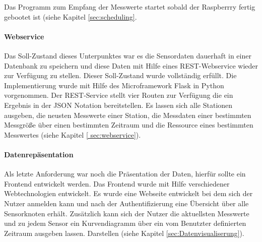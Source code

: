 Das Programm zum Empfang der Messwerte startet sobald der Raspberrry fertig gebootet ist (siehe Kapitel \ref{sec:scheduling}.
\paragraph{Webservice} Das Soll-Zustand dieses Unterpunktes war es die Sensordaten dauerhaft in einer Datenbank zu speichern und diese Daten mit Hilfe eines REST-Webservice wieder zur Verfügung zu stellen. Dieser Soll-Zustand wurde vollständig erfüllt. Die Implementierung wurde mit Hilfe des Microframework Flask in Python vorgenommen. Der REST-Service stellt vier Routen zur Verfügung die ein Ergebnis in der JSON Notation bereitstellen. Es lassen sich alle Stationen ausgeben, die neusten Messwerte einer Station, die Messdaten einer bestimmten Messgröße über einen bestimmten Zeitraum und die Ressource eines bestimmten Messwertes (siehe Kapitel \ref{ sec:webservice}).
\paragraph{Datenrepäsentation} Als letzte Anforderung war noch die Präsentation der Daten, hierfür sollte ein Frontend entwickelt werden. Das Frontend wurde mit Hilfe verschiedener Webtechnologien entwickelt. Es wurde eine Webseite entwickelt bei dem sich der Nutzer anmelden kann und nach der Authentifizierung eine Übersicht über alle Sensorknoten erhält. Zusätzlich kann sich der Nutzer die aktuellsten Messwerte und zu jedem Sensor ein Kurvendiagramm über ein vom Benutzter definierten Zeitraum ausgeben lassen. Darstellen (siehe Kapitel \ref{sec:Datenvisualiserung}).


